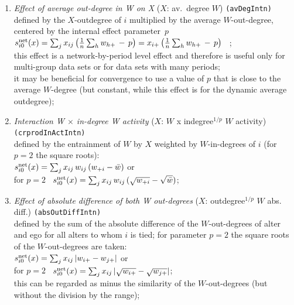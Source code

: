 \documentclass[a4paper,fleqn,11pt]{article}
\newcommand{\+}{\, + \,}
\newcommand{\vit}{\theenumi}
\begin{document}
\begin{enumerate}
 \item {\em Effect of average out-degree in W on X } ($X$: av.\ degree $W$)
 \texttt{(avDegIntn)}\\
 defined by the $X$-outdegree of $i$ multiplied by the
 average $W$-out-degree, centered by the internal effect parameter~$p$\\[0.2em]
 $s^{\rm net}_{i\vit}(x) =  \sum_j x_{ij}\, \big( \frac 1n \sum_h  {w_{h+}} \,-\, p \big)=
                           x_{i+}\, \big( \frac 1n \sum_h w_{h+} \,-\, p \big) $ \, ;\\[0.2em]
  this effect is a network-by-period level effect and therefore is useful only
  for \\
  multi-group data sets or for data sets with many periods;\\
  it may be beneficial for convergence to use a value of $p$ that is
  close to the average $W$-degree (but constant, while this effect
  is for the dynamic average outdegree);

 \item {\em Interaction W $\times$ in-degree W activity } ($X$: $W$ x indegree$^{1/p}$ $W$ activity)
         \texttt{(crprodInActIntn)}\\
 defined by the entrainment of $W$ by $X$ weighted by $W$-in-degrees of $i$ (for $p = 2$ the square roots):\\[0.2em]
 $s^{\rm net}_{i\vit}(x) =  \sum_j x_{ij}\, w_{ij}\,({w_{+i}} - {\bar w}) $ or\\[0.2em]
for $p=2$ \  $s^{\rm net}_{i\vit}(x) =  \sum_j x_{ij}\,w_{ij}\, (\sqrt{w_{+i}} - \sqrt{\bar w}) $;\\[0.2em]

 \item {\em Effect of absolute difference of both W out-degrees} ($X$: outdegree$^{1/p}$ $W$ abs. diff.) \texttt{(absOutDiffIntn)}\\
 defined by   the sum of the absolute difference of the $W$-out-degrees of alter and ego
 for all alters to whom $i$ is tied;
 for parameter $p = 2$ the square roots of the $W$-out-degrees are taken:\\[0.2em]
 $s^{\rm net}_{i\vit}(x) =
   \sum_j x_{ij}\, | w_{i+} - w_{j+} | $ or\\[0.2em]
for $p=2$ \  $s^{\rm net}_{i\vit}(x) =  \sum_j x_{ij}\, | \sqrt{w_{i+}} - \sqrt{w_{j+} } | $;\\[0.2em]
 this can be regarded as minus the similarity of the $W$-out-degrees
 (but without the division by the range);


\end{enumerate}
\end{document}
